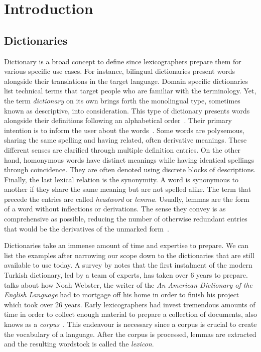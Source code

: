 \chapter{Introduction}\label{chap:introduction}%
\section{Dictionaries}%
\label{sec:dictionaries}
Dictionary is a broad concept to define since lexicographers prepare them for various specific use cases.
For instance, bilingual dictionaries present words alongside their translations in the target language.
Domain specific dictionaries list technical terms that target people who are familiar with the terminology.
Yet, the term \emph{dictionary} on its own brings forth the monolingual type, sometimes known as descriptive, into consideration.
This type of dictionary presents words alongside their definitions following an alphabetical order~\cite{sterkenburg_practical_2003}.
Their primary intention is to inform the user about the words~\cite{uzun_modern_2005}.
Some words are polysemous, sharing the same spelling and having related, often derivative meanings.
These different senses are clarified through multiple definition entries.
On the other hand, homonymous words have distinct meanings while having identical spellings through coincidence.
They are often denoted using discrete blocks of descriptions.
Finally, the last lexical relation is the synonymity.
A word is synonymous to another if they share the same meaning but are not spelled alike.
The term that precede the entries are called \emph{headword} or \emph{lemma}.
Usually, lemmas are the form of a word without inflections or derivations.
The sense they convey is as comprehensive as possible, reducing the number of otherwise redundant entries that would be the derivatives of the unmarked form~\cite{ibrahim_usta_turkce_2006}.

Dictionaries take an immense amount of time and expertise to prepare.
We can list the examples after narrowing our scope down to the dictionaries that are still available to use today.
A survey by \textcite{uzun_1945ten_1999} notes that the first instalment of the modern Turkish dictionary, led by a team of experts, has taken over 6 years to prepare.
\textcite{kendall_forgotten_2011} talks about how Noah Webster, the writer of the \emph{An American Dictionary of the English Language} had to mortgage off his home in order to finish his project which took over 26 years.
Early lexicographers had invest tremendous amounts of time in order to collect enough material to prepare a collection of documents, also knows as a \emph{corpus}~\cite{uzun_1945ten_1999}.
This endeavour is necessary since a corpus is crucial to create the vocabulary of a language.
After the corpus is processed, lemmas are extracted and the resulting wordstock is called the \emph{lexicon}.

